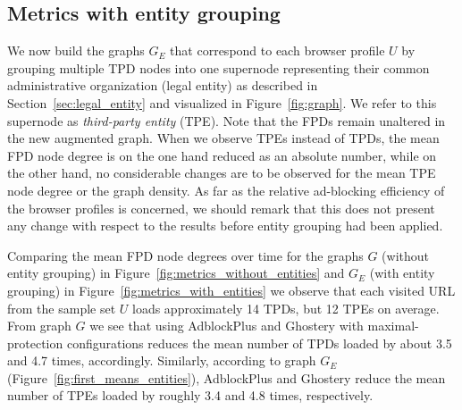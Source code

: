 

\subsection{Metrics with entity grouping}
We now build the graphs $G_E$ that correspond to each browser profile $U$ by grouping multiple TPD nodes into one supernode representing their common administrative organization (legal entity) as described in Section~\ref{sec:legal_entity} and visualized in Figure~\ref{fig:graph}. We refer to this supernode as \textit{third-party entity} (TPE). Note that the FPDs remain unaltered in the new augmented graph. When we observe TPEs instead of TPDs, the mean FPD node degree is on the one hand reduced as an absolute number, while on the other hand, no considerable changes are to be observed for the mean TPE node degree or the graph density. As far as the relative ad-blocking efficiency of the browser profiles is concerned, we should remark that this does not present any change with respect to the results before entity grouping had been applied.

Comparing the mean FPD node degrees over time for the graphs $G$ (without entity grouping) in Figure~\ref{fig:metrics_without_entities} and $G_E$ (with entity grouping) in Figure~\ref{fig:metrics_with_entities} we observe that each visited URL from the sample set $U$ loads approximately 14 TPDs, but 12 TPEs on average. From graph $G$ we see that using AdblockPlus and Ghostery with maximal-protection configurations reduces the mean number of TPDs loaded by about 3.5 and 4.7 times, accordingly. Similarly, according to graph $G_E$ (Figure~\ref{fig:first_means_entities}), AdblockPlus and Ghostery reduce the mean number of TPEs loaded by roughly 3.4 and 4.8 times, respectively.

